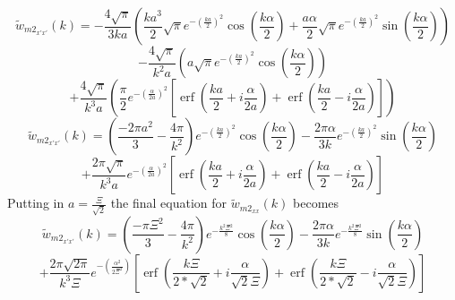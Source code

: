 \documentclass[12pt]{article}
\begin{document}
\[{}\]
\begin{displaymath}{\widetilde{w}_{{m2}_{x'x'}}(k)=-\frac{4\sqrt{\pi}}{3ka}\left(\frac{ka^3}{2}\sqrt{\pi}e^{-\left(\frac{ka}{2}\right)^2}\cos(\frac{k\alpha}{2})+\frac{a\alpha}{2}\sqrt{\pi}e^{-\left(\frac{ka}{2}\right)^2}\sin(\frac{k\alpha}{2})\right)}\end{displaymath} 
\begin{displaymath}{-\frac{4\sqrt{\pi}}{k^2a}\left(a\sqrt{\pi}e^{-\left(\frac{ka}{2}\right)^2}\cos(\frac{k\alpha}{2})\right)}\end{displaymath} 
\begin{equation}{+\frac{4\sqrt{\pi}}{k^3a}\left(\frac{\pi}{2}e^{-\left(\frac{\alpha}{2a}\right)^2}\left[\operatorname{erf}\left(\frac{ka}{2}+i\frac{\alpha}{2a}\right)+\operatorname{erf}\left(\frac{ka}{2}-i\frac{\alpha}{2a}\right)\right]\right)}\end{equation} 
\[{}\]
\begin{displaymath}{\widetilde{w}_{{m2}_{x'x'}}(k)=\left(\frac{-2\pi{a}^2}{3}-\frac{4\pi}{k^2}\right)e^{-\left(\frac{ka}{2}\right)^2}\cos(\frac{k\alpha}{2})-\frac{2\pi\alpha}{3k}e^{-\left(\frac{ka}{2}\right)^2}\sin(\frac{k\alpha}{2})}\end{displaymath} 
\begin{equation}{+\frac{2\pi\sqrt{\pi}}{k^3a}e^{-\left(\frac{\alpha}{2a}\right)^2}\left[\operatorname{erf}\left(\frac{ka}{2}+i\frac{\alpha}{2a}\right)+\operatorname{erf}\left(\frac{ka}{2}-i\frac{\alpha}{2a}\right)\right]}\end{equation} 
Putting in $a=\frac{\Xi}{\sqrt{2}}$ the final equation for $\widetilde{w}_{{m2}_{xx}}(k)$ becomes
\[{}\] \color{green}
\begin{displaymath}{\widetilde{w}_{{m2}_{x'x'}}(k)=\left(\frac{-\pi{\Xi}^2}{3}-\frac{4\pi}{k^2}\right)e^{-\frac{k^2\Xi^2}{8}}\cos(\frac{k\alpha}{2})-\frac{2\pi\alpha}{3k}e^{-\frac{k^2\Xi^2}{8}}\sin(\frac{k\alpha}{2})}\end{displaymath} 
\begin{equation}{+\frac{2\pi\sqrt{2\pi}}{k^3\Xi}e^{-\left(\frac{\alpha^2}{2\Xi^2}\right)}\left[\operatorname{erf}\left(\frac{k\Xi}{2*\sqrt{2}}+i\frac{\alpha}{\sqrt{2}\Xi}\right)+\operatorname{erf}\left(\frac{k\Xi}{2*\sqrt{2}}-i\frac{\alpha}{\sqrt{2}\Xi}\right)\right]}\end{equation} 
\end{document}

